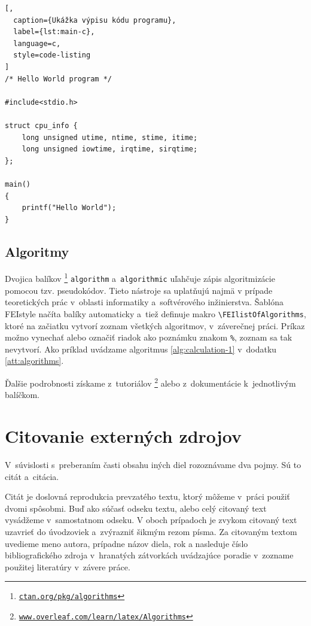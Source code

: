 \begin{lstlisting}[,
  caption={Ukážka výpisu kódu programu},
  label={lst:main-c},
  language=c,
  style=code-listing
]
/* Hello World program */

#include<stdio.h>

struct cpu_info {
    long unsigned utime, ntime, stime, itime;
    long unsigned iowtime, irqtime, sirqtime;
};

main()
{
    printf("Hello World");
}
\end{lstlisting}

\subsection*{Algoritmy}
Dvojica balíkov%
\footnote{\href{https://ctan.org/pkg/algorithms}{\texttt{ctan.org/pkg/algorithms}}}
\verb|algorithm|
a~\verb|algorithmic| uľahčuje zápis algoritmizácie pomocou tzv. pseudokódov.
Tieto nástroje sa uplatňujú najmä v prípade teoretických prác v~oblasti informatiky a~softvérového inžinierstva.
Šablóna FEIstyle načíta balíky automaticky a~tiež definuje makro \verb|\FEIlistOfAlgorithms|, ktoré na začiatku vytvorí zoznam všetkých algoritmov, v~záverečnej práci.
Príkaz možno vynechať alebo označiť riadok ako poznámku znakom \verb|%|, zoznam sa tak nevytvorí. Ako príklad uvádzame algoritmus \ref{alg:calculation-1} v~dodatku \ref{att:algorithms}.

Ďalšie podrobnosti získame z~tutoriálov%
\footnote{\href{https://www.overleaf.com/learn/latex/Algorithms}{\texttt{www.overleaf.com/learn/latex/Algorithms}}}
alebo z~dokumentácie k~jednotlivým balíčkom.

\section{Citovanie externých zdrojov}\label{sec:citation}
V~súvislosti s~preberaním časti obsahu iných diel
rozoznávame dva pojmy. Sú to citát a~citácia.

Citát je doslovná reprodukcia prevzatého textu,
ktorý môžeme v~práci použiť dvomi spôsobmi.
Buď ako súčasť odseku textu,
alebo celý citovaný text vysádžeme v~samostatnom odseku.
V oboch prípadoch je zvykom citovaný text uzavrieť do úvodzoviek
a~zvýrazniť šikmým rezom písma.
Za citovaným textom uvedieme meno autora,
prípadne názov diela, rok a nasleduje číslo bibliografického
zdroja v~hranatých zátvorkách uvádzajúce poradie
v~zozname použitej literatúry v~závere práce.

